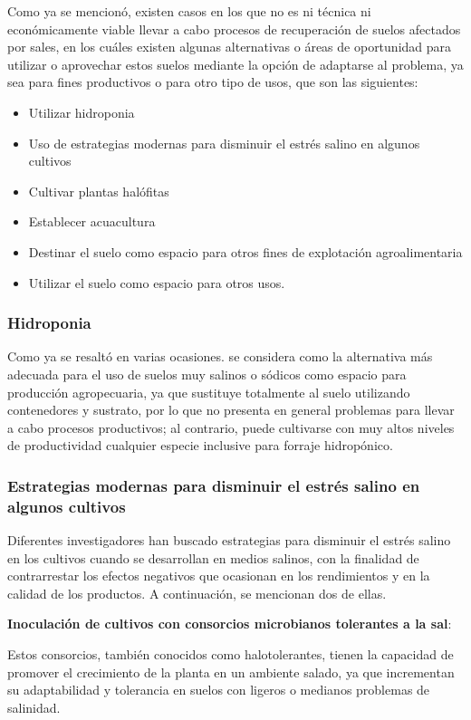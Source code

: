 Como ya se mencionó, existen casos en los que no es ni técnica ni
económicamente viable llevar a cabo procesos de recuperación de suelos afectados
por sales, en los cuáles existen algunas alternativas o áreas de oportunidad para
utilizar o aprovechar estos suelos mediante la opción de adaptarse al problema, ya
sea para fines productivos o para otro tipo de usos, que son las siguientes:
\begin{itemize}
  \item Utilizar hidroponia
  \item Uso de estrategias modernas para disminuir el estrés salino en algunos cultivos
  \item Cultivar plantas halófitas
  \item Establecer acuacultura
  \item Destinar el suelo como espacio para otros fines de explotación agroalimentaria
  \item Utilizar el suelo como espacio para otros usos.
\end{itemize}

\subsubsection{Hidroponia}
Como ya se resaltó en varias ocasiones. se considera como la alternativa más adecuada para el uso de suelos muy salinos o sódicos como espacio para producción agropecuaria, ya que sustituye totalmente al suelo utilizando contenedores y sustrato, por lo que no presenta en general problemas para llevar a cabo procesos productivos; al contrario, puede cultivarse con muy altos niveles de productividad cualquier especie inclusive para forraje hidropónico.
\subsubsection{Estrategias modernas para disminuir el estrés salino en algunos cultivos}
Diferentes investigadores han buscado estrategias para disminuir el estrés salino en los cultivos cuando se desarrollan en medios salinos, con la finalidad de contrarrestar los efectos negativos que ocasionan en los rendimientos y en la calidad de los productos. A continuación, se mencionan dos de ellas.

\textbf{Inoculación de cultivos con consorcios microbianos tolerantes a la sal}:

Estos consorcios, también conocidos como halotolerantes, tienen la capacidad de promover el crecimiento de la planta en un ambiente salado, ya que incrementan su adaptabilidad y tolerancia en suelos con ligeros o medianos problemas de salinidad.

